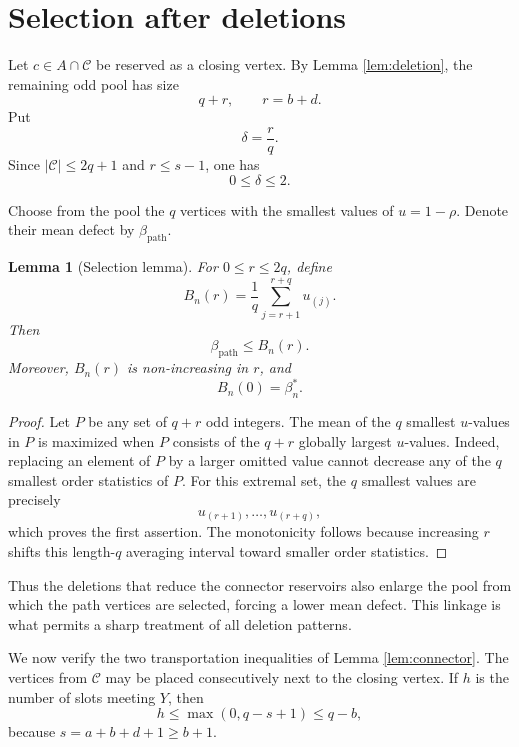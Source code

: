 \documentclass{article}
\newtheorem{lemma}[theorem]{Lemma}
\theoremstyle{remark}
\newcommand{\Ccal}{\mathcal{C}}
\begin{document}
\section{Selection after deletions}

Let \(c\in A\cap\Ccal\) be reserved as a closing vertex. By Lemma
\ref{lem:deletion}, the remaining odd pool has size
\[
 q+r,
 \qquad
 r=b+d.
\]
Put
\[
 \delta=\frac rq.
\]
Since \(|\Ccal|\leq2q+1\) and \(r\leq s-1\), one has
\[
 0\leq\delta\leq2.
\]

Choose from the pool the \(q\) vertices with the smallest values of
\(u=1-\rho\). Denote their mean defect by \(\beta_{\mathrm{path}}\).

\begin{lemma}[Selection lemma]\label{lem:selection}
For \(0\leq r\leq2q\), define
\begin{equation}\label{eq:B-r}
 B_n(r)=\frac1q\sum_{j=r+1}^{r+q}u_{(j)}.
\end{equation}
Then
\[
 \beta_{\mathrm{path}}\leq B_n(r).
\]
Moreover, \(B_n(r)\) is non-increasing in \(r\), and
\[
 B_n(0)=\beta^\ast_n.
\]
\end{lemma}

\begin{proof}
Let \(P\) be any set of \(q+r\) odd integers. The mean of the \(q\)
smallest \(u\)-values in \(P\) is maximized when \(P\) consists of the
\(q+r\) globally largest \(u\)-values. Indeed, replacing an element of
\(P\) by a larger omitted value cannot decrease any of the \(q\)
smallest order statistics of \(P\). For this extremal set, the \(q\)
smallest values are precisely
\[
 u_{(r+1)},\ldots,u_{(r+q)},
\]
which proves the first assertion. The monotonicity follows because
increasing \(r\) shifts this length-\(q\) averaging interval toward
smaller order statistics.
\end{proof}

Thus the deletions that reduce the connector reservoirs also enlarge
the pool from which the path vertices are selected, forcing a lower
mean defect. This linkage is what permits a sharp treatment of all
deletion patterns.

We now verify the two transportation inequalities of Lemma
\ref{lem:connector}. The vertices from \(\Ccal\) may be placed
consecutively next to the closing vertex. If \(h\) is the number of
slots meeting \(Y\), then
\begin{equation}\label{eq:h-bound}
 h\leq\max(0,q-s+1)\leq q-b,
\end{equation}
because \(s=a+b+d+1\geq b+1\).
\end{document}

